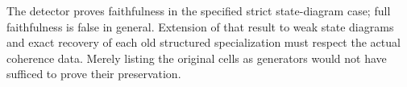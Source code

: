 \documentclass[11pt]{article}
\begin{document}
The detector proves faithfulness in the specified strict state-diagram case; full faithfulness is false in general. Extension of that result to weak state diagrams and exact recovery of each old structured specialization must respect the actual coherence data. Merely listing the original cells as generators would not have sufficed to prove their preservation.
\end{document}
